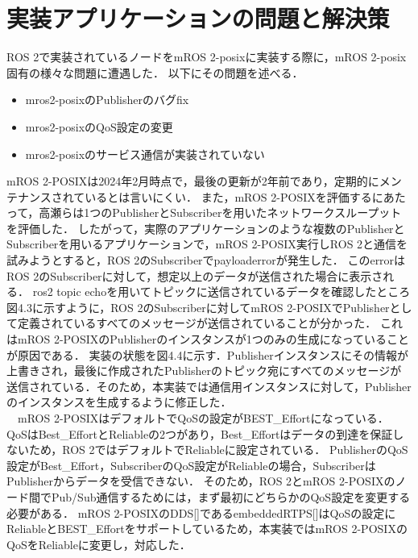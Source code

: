 \section{実装アプリケーションの問題と解決策}
ROS 2で実装されているノードをmROS 2-posixに実装する際に，mROS 2-posix固有の様々な問題に遭遇した．
以下にその問題を述べる．
\begin{itemize}
    \item mros2-posixのPublisherのバグfix
    \item mros2-posixのQoS設定の変更
    \item mros2-posixのサービス通信が実装されていない
\end{itemize}
mROS 2-POSIXは2024年2月時点で，最後の更新が2年前であり，定期的にメンテナンスされているとは言いにくい．
また，mROS 2-POSIXを評価するにあたって，高瀬らは1つのPublisherとSubscriberを用いたネットワークスループットを評価した．
したがって，実際のアプリケーションのような複数のPublisherとSubscriberを用いるアプリケーションで，mROS 2-POSIX実行しROS 2と通信を試みようとすると，ROS 2のSubscriberでpayloaderrorが発生した．
このerrorはROS 2のSubscriberに対して，想定以上のデータが送信された場合に表示される．
ros2 topic echoを用いてトピックに送信されているデータを確認したところ図4.3に示すように，ROS 2のSubscriberに対してmROS 2-POSIXでPublisherとして定義されているすべてのメッセージが送信されていることが分かった．
これはmROS 2-POSIXのPublisherのインスタンスが1つのみの生成になっていることが原因である．
実装の状態を図4.4に示す．Publisherインスタンスにその情報が上書きされ，最後に作成されたPublisherのトピック宛にすべてのメッセージが送信されている．そのため，本実装では通信用インスタンスに対して，Publisherのインスタンスを生成するように修正した．
\\　mROS 2-POSIXはデフォルトでQoSの設定がBEST\_Effortになっている．
QoSはBest\_EffortとReliableの2つがあり，Best\_Effortはデータの到達を保証しないため，ROS 2ではデフォルトでReliableに設定されている．
PublisherのQoS設定がBest\_Effort，SubscriberのQoS設定がReliableの場合，SubscriberはPublisherからデータを受信できない．
そのため，ROS 2とmROS 2-POSIXのノード間でPub/Sub通信するためには，まず最初にどちらかのQoS設定を変更する必要がある．
mROS 2-POSIXのDDS[]であるembeddedRTPS[]はQoSの設定にReliableとBEST\_Effortをサポートしているため，本実装ではmROS 2-POSIXのQoSをReliableに変更し，対応した．

